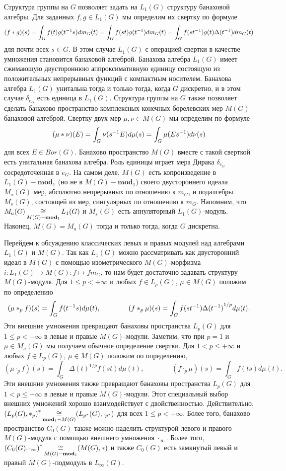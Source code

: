 Структура группы на $G$ позволяет задать на $L_1(G)$ структуру банаховой
алгебры. Для заданных $f,g\in L_1(G)$ мы определим их свертку по формуле
$$
(f\ast g)(s)=\int_G f(t)g(t^{-1}s)dm_G(t)
=\int_G f(st)g(t^{-1})dm_G(t)
=\int_G f(st^{-1})g(t)\Delta(t^{-1})dm_G(t)
$$
для почти всех $s\in G$. В этом случае $L_1(G)$ с операцией свертки в качестве
умножения становится банаховой алгеброй. Банахова алгебра $L_1(G)$ имеет
сжимающую двустороннюю аппроксимативную единицу состоящую из положительных
непрерывных функций с компактным носителем. Банахова алгебра $L_1(G)$ унитальна
тогда и только тогда, когда $G$ дискретно, и в этом случае $\delta_{e_G}$ есть
единица в $L_1(G)$. Структура группы на $G$ также позволяет сделать банахово
пространство комплексных конечных борелевских мер $M(G)$ банаховой алгеброй.
Свертку двух мер $\mu,\nu\in M(G)$ мы определим по формуле
$$
(\mu\ast \nu)(E)=\int_G\nu(s^{-1}E)d\mu(s)=\int_G\mu(Es^{-1})d\nu(s)
$$
для всех $E\in Bor(G)$. Банахово пространство $M(G)$ вместе с такой сверткой
есть унитальная банахова алгебра. Роль единицы играет  мера Дирака
$\delta_{e_G}$ сосредоточенная в $e_G$. На самом деле, $M(G)$ есть
копроизведение в $L_1(G)-\mathbf{mod}_1$ (но не в $M(G)-\mathbf{mod}_1$) своего
двустороннего идеала $M_a(G)$ мер, абсолютно непрерывных по отношению к $m_G$, и
подалгебры $M_s(G)$, состоящей из мер, сингулярных по отношению к $m_G$.
Напомним, что $M_a(G)\mathop{\mathbin{\cong}}\limits_{M(G)-\mathbf{mod}_1}L_1(G)$ и $M_s(G)$ есть
аннуляторный $L_1(G)$-модуль. Наконец, $M(G)=M_a(G)$ тогда и только тогда, когда
$G$ дискретна. 

Перейдем к обсуждению классических левых и правых модулей над алгебрами $L_1(G)$
и $M(G)$. Так как $L_1(G)$ можно рассматривать как двусторонний идеал в $M(G)$ с
помощью изометрического $M(G)$-морфизма $i:L_1(G)\to M(G):f\mapsto f m_G$, то
нам будет достаточно задавать структуру $M(G)$-модуля. Для $1\leq p<+\infty$ и
любых $f\in L_p(G)$, $\mu\in M(G)$ положим по определению
$$
(\mu\ast_p f)(s)=\int_G f(t^{-1}s)d\mu(t),
\qquad\qquad
(f\ast_p \mu)(s)=\int_G f(st^{-1}){\Delta(t^{-1})}^{1/p}d\mu(t).
$$
Эти внешние умножения превращают банаховы пространства $L_p(G)$ для 
$1\leq p<+\infty$ в левые и правые $M(G)$-модули. Заметим, что при $p=1$ и 
$\mu\in M_a(G)$ мы получаем обычное определение свертки. 
Для $1<p\leq +\infty$ и любых
$f\in L_p(G)$, $\mu\in M(G)$ положим по определению,
$$
(\mu\cdot_p f)(s)=\int_G {\Delta(t)}^{1/p}f(st)d\mu(t),
\qquad\qquad
(f\cdot_p \mu)(s)=\int_G f(ts)d\mu(t).
$$
Эти внешние умножения также превращают банаховы пространства $L_p(G)$ для
$1<p\leq+\infty$ в левые и правые $M(G)$-модули. Этот специальный выбор внешних
умножений хорошо взаимодействует с двойственностью. Действительно,
${(L_p(G),\ast_p)}^*\mathop{\mathbin{\cong}}\limits_{\mathbf{mod}_1-M(G)}(L_{p^*}(G),\cdot_{p^*})$ для
всех $1\leq p<+\infty$. Более того, банахово пространство $C_0(G)$ также можно
наделить структурой левого и правого $M(G)$-модуля с помощью внешнего умножения
$\cdot_\infty$. Более того,
${(C_0(G),\cdot_\infty)}^*\mathop{\mathbin{\cong}}\limits_{M(G)-\mathbf{mod}_1}(M(G),\ast)$ и также
$C_0(G)$ есть замкнутый левый и правый $M(G)$-подмодуль в $L_\infty(G)$.

